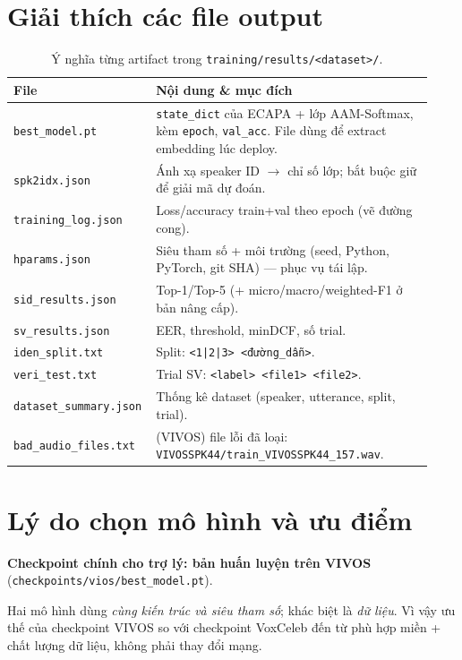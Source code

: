 \documentclass[12pt,a4paper]{article}
\begin{document}
\section{Giải thích các file output}
\begin{table}[H]
\centering\small
\begin{tabular}{p{0.28\linewidth}p{0.65\linewidth}}
\toprule
\textbf{File} & \textbf{Nội dung \& mục đích} \\
\midrule
\texttt{best\_model.pt} & \texttt{state\_dict} của ECAPA + lớp AAM-Softmax, kèm
\texttt{epoch}, \texttt{val\_acc}. File dùng để extract embedding lúc deploy. \\
\texttt{spk2idx.json} & Ánh xạ speaker ID $\to$ chỉ số lớp; bắt buộc giữ để giải mã
dự đoán. \\
\texttt{training\_log.json} & Loss/accuracy train+val theo epoch (vẽ đường cong). \\
\texttt{hparams.json} & Siêu tham số + môi trường (seed, Python, PyTorch, git SHA)
--- phục vụ tái lập. \\
\texttt{sid\_results.json} & Top-1/Top-5 (+ micro/macro/weighted-F1 ở bản nâng cấp). \\
\texttt{sv\_results.json} & EER, threshold, minDCF, số trial. \\
\texttt{iden\_split.txt} & Split: \texttt{<1|2|3> <đường\_dẫn>}. \\
\texttt{veri\_test.txt} & Trial SV: \texttt{<label> <file1> <file2>}. \\
\texttt{dataset\_summary.json} & Thống kê dataset (speaker, utterance, split, trial). \\
\texttt{bad\_audio\_files.txt} & (VIVOS) file lỗi đã loại: \texttt{VIVOSSPK44/train\_VIVOSSPK44\_157.wav}. \\
\bottomrule
\end{tabular}
\caption{Ý nghĩa từng artifact trong \texttt{training/results/<dataset>/}.}
\end{table}

\section{Lý do chọn mô hình và ưu điểm}
\textbf{Checkpoint chính cho trợ lý: bản huấn luyện trên VIVOS}
(\texttt{checkpoints/vios/best\_model.pt}).

\begin{diembox}
Hai mô hình dùng \emph{cùng kiến trúc và siêu tham số}; khác biệt là \emph{dữ liệu}.
Vì vậy ưu thế của checkpoint VIVOS so với checkpoint VoxCeleb đến từ phù hợp miền +
chất lượng dữ liệu, không phải thay đổi mạng.
\end{diembox}
\end{document}

